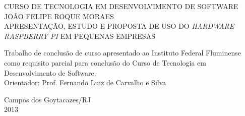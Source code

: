 \begin{titlepage}
 \begin{figure}[ht]
 \centering
 \end{figure}
 \begin{center}
   {\large CURSO DE TECNOLOGIA EM DESENVOLVIMENTO DE SOFTWARE} \\ [3.5cm]
   {\large JOÃO FELIPE ROQUE MORAES} \\ [4cm]
   {\large APRESENTAÇÃO, ESTUDO E PROPOSTA DE USO DO \textit{HARDWARE RASPBERRY PI} EM PEQUENAS EMPRESAS } \\ [2cm]
   \hspace{.45\textwidth} %
   \begin{minipage}{0.5\textwidth}
   \begin{espacosimples}
        Trabalho de conclusão de curso apresentado ao Instituto Federal Fluminense como requisito parcial para conclusão do Curso de Tecnologia em Desenvolvimento de Software.\\[1.5cm]
        Orientador: Prof. Fernando Luiz de Carvalho e Silva
    \end{espacosimples}
    \end{minipage}
   \vfill
   {\large Campos dos Goytacazes/RJ} \\
   {\large 2013}
 \end{center}
\end{titlepage}
